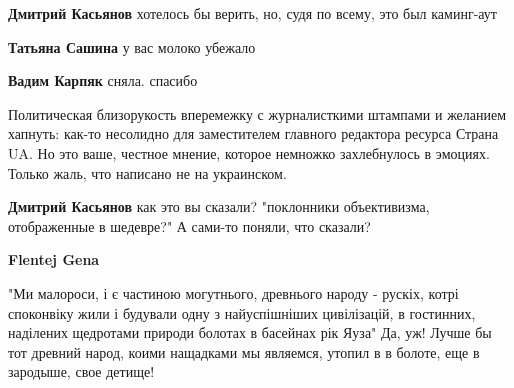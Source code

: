 \begin{itemize}
\begin{itemize}
\textbf{Дмитрий Касьянов} хотелось бы верить, но, судя по всему, это был каминг-аут

 
\textbf{Татьяна Сашина} у вас молоко убежало

 
\textbf{Вадим Карпяк} сняла. спасибо

 

Политическая близорукость вперемежку с журналисткими штампами и желанием
хапнуть: как-то несолидно для заместителем главного редактора ресурса Страна
UA. Но это ваше, честное мнение, которое немножко захлебнулось в эмоциях. Только
жаль, что написано не на украинском.


 
\textbf{Дмитрий Касьянов} как это вы сказали? "поклонники объективизма, отображенные в шедевре?" А сами-то поняли, что сказали?

 
\textbf{Flentej Gena} 

"Ми малороси, і є частиною могутнього, древнього народу - рускіх, котрі споконвіку
жили і будували одну з найуспішніших цивілізацій, в гостинних, наділених
щедротами природи болотах в басейнах рік Яуза" Да, уж! Лучше бы тот древний
народ, коими нащадками мы являемся, утопил в в болоте, еще в зародыше, свое
детище!


 

\end{itemize}
\end{itemize}
